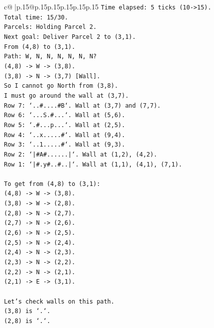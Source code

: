 \documentclass{article}
\begin{document}
{\begin{supertabular}{c@{$\;$}|p{.15\linewidth}@{}p{.15\linewidth}p{.15\linewidth}p{.15\linewidth}p{.15\linewidth}p{.15\linewidth}}
{{{\texttt{Time elapsed: 5 ticks (10{-}>15).} \\
\texttt{Total time: 15/30.} \\
\texttt{Parcels: Holding Parcel 2.} \\
\texttt{Next goal: Deliver Parcel 2 to (3,1).} \\
\texttt{From (4,8) to (3,1).} \\
\texttt{Path: W, N, N, N, N, N, N?} \\
\texttt{(4,8) {-}> W {-}> (3,8).} \\
\texttt{(3,8) {-}> N {-}> (3,7) {[}Wall{]}.} \\
\texttt{So I cannot go North from (3,8).} \\
\texttt{I must go around the wall at (3,7).} \\
\texttt{Row 7: `..\#....\#B`. Wall at (3,7) and (7,7).} \\
\texttt{Row 6: `...S.\#...`. Wall at (5,6).} \\
\texttt{Row 5: `.\#...p...`. Wall at (2,5).} \\
\texttt{Row 4: `..x.....\#`. Wall at (9,4).} \\
\texttt{Row 3: `..1.....\#`. Wall at (9,3).} \\
\texttt{Row 2: `|\#A\#......|`. Wall at (1,2), (4,2).} \\
\texttt{Row 1: `|\#.y\#..\#..|`. Wall at (1,1), (4,1), (7,1).} \\
\\ 
\texttt{To get from (4,8) to (3,1):} \\
\texttt{(4,8) {-}> W {-}> (3,8).} \\
\texttt{(3,8) {-}> W {-}> (2,8).} \\
\texttt{(2,8) {-}> N {-}> (2,7).} \\
\texttt{(2,7) {-}> N {-}> (2,6).} \\
\texttt{(2,6) {-}> N {-}> (2,5).} \\
\texttt{(2,5) {-}> N {-}> (2,4).} \\
\texttt{(2,4) {-}> N {-}> (2,3).} \\
\texttt{(2,3) {-}> N {-}> (2,2).} \\
\texttt{(2,2) {-}> N {-}> (2,1).} \\
\texttt{(2,1) {-}> E {-}> (3,1).} \\
\\ 
\texttt{Let's check walls on this path.} \\
\texttt{(3,8) is `.`.} \\
\texttt{(2,8) is `.`.} \\
}}}
\end{supertabular}}
\end{document}
